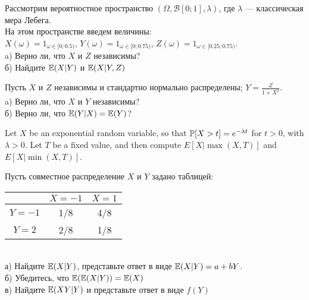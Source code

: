 \begin{solution}
\begin{solution}
\begin{solution}
\begin{solution}
\begin{solution}
\begin{solution}
\begin{solution}
\begin{solution}
\end{solution}

\begin{problem}
Рассмотрим вероятностное пространство
$(\Omega,\mathcal{B}[0;1],\lambda)$, где $\lambda$ --- классическая
мера Лебега.\\
На этом пространстве введем величины: \\
$X(\omega)=1_{\omega\in[0;0.5)}$,
$Y(\omega)=1_{\omega\in[0;0.75)}$,
$Z(\omega)=1_{\omega\in[0.25;0.75)}$. \\
a) Верно ли, что $X$ и $Z$ независимы? \\
б) Найдите $\E(X|Y)$ и $\E(X|Y,Z)$ 
\end{problem} 
\begin{solution} 

\end{solution}

\begin{problem}
Пусть $X$ и $Z$ независимы и стандартно нормально распределены;
$Y=\frac{Z}{1+X^{2}}$. \\
a) Верно ли, что $X$ и $Y$ независимы? \\
б) Верно ли, что $\E(Y|X)=\E(Y)$? 
\end{problem} 
\begin{solution} 

\end{solution}

\begin{problem}
 Let $X$ be an exponential random variable, so that $\P[X > t] = e^{-\lambda t}$ 
	for $t > 0$, with $\lambda > 0$. 	Let $T$ be a fixed value, and then compute 
	$E[ X | \max(X,T) ]$ and $E[X | \min(X,T)]$.  
\end{problem} 
\begin{solution} 

\end{solution}

\begin{problem}
 Пусть совместное распределение $X$ и $Y$ задано таблицей: \\
\begin{tabular}{|c|c|c|}
  \hline
   & $X=-1$ & $X=1$ \\
  \hline
  $Y=-1$ & 1/8 & 4/8 \\
  $Y=2$ & 2/8 & 1/8 \\
  \hline
\end{tabular} \\
а) Найдите $\E(X|Y)$, представьте ответ в виде $\E(X|Y)=a+bY$. \\
б) Убедитесь, что $\E(\E(X|Y))=\E(X)$ \\
в) Найдите $\E(XY|Y)$ и представьте ответ в виде $f(Y)$ 
\end{problem} 
\begin{solution} 


\end{solution}
\end{solution}
\end{solution}
\end{solution}
\end{solution}
\end{solution}
\end{solution}
\end{solution}
